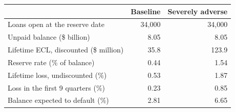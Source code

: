 \begin{tabular}{lrr}
\toprule
& Baseline & Severely adverse \\
\midrule
Loans open at the reserve date & 34,000 & 34,000 \\
Unpaid balance (\$ billion) & 8.05 & 8.05 \\
Lifetime ECL, discounted (\$ million) & 35.8 & 123.9 \\
Reserve rate (\% of balance) & 0.44 & 1.54 \\
Lifetime loss, undiscounted (\%) & 0.53 & 1.87 \\
Loss in the first 9 quarters (\%) & 0.23 & 0.85 \\
Balance expected to default (\%) & 2.81 & 6.65 \\
\bottomrule
\end{tabular}

